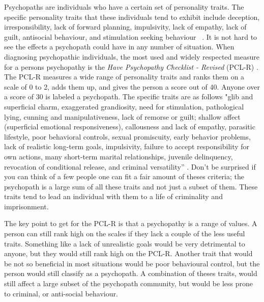 \documentclass[12pt,jou]{apa}
\begin{document}


\pagestyle{fancy}
\fancyhf{}
\fancyhead[R]{\thepage}

Psychopaths are individuals who have a certain set of personality traits.
 The specific personality traits that these individuals tend
to exhibit include deception, irresponsibility, lack of forward planning,
impulsivity, lack of empathy, lack of guilt, antisocial behaviour, and
stimulation seeking behaviour ~\cite{brazil}. It is not hard to see the effects
a psychopath could have in any number of situation. When diagnosing
psychopathic individuals, the most used and widely respected measure for a
persons psychopathy is the \textit{Have Psychopathy Checklist - Revised
}(PCL-R) \cite{nickerson2014}. The PCL-R measures a wide range of personality
traits and ranks them on a scale of 0 to 2, adds them up, and gives the person
a score out of 40. Anyone over a score of 30 is labeled a psychopath. The
specific traits are as follows "glib and superficial charm, exaggerated
grandiosity, need for stimulation, pathological lying, cunning and
manipulativeness, lack of remorse or guilt; shallow affect (superficial
emotional responsiveness), callousness and lack of empathy, parasitic
lifestyle, poor behavioral controls, sexual promiscuity, early behavior
problems, lack of realistic long-term goals, impulsivity, failure to accept
responsibility for own actions, many short-term marital relationships, juvenile
delinquency, revocation of conditional release, and criminal versatility”
\cite{hareharpur1991}. Don't be surprised if you can think of a few people one
can fit a fair amount of theses criteria; the psychopath is a large sum of all
these traits and not just a subset of them. These traits tend to lead an
individual with them to a life of criminality and imprisonment. 

The key point to get for the PCL-R is that a psychopathy is a range of values.
A person can still rank high on the scales if they lack a couple of the less
useful traits. Something like a lack of unrealistic goals would be very
detrimental to anyone, but they would still rank high on the PCL-R. Another
trait that would be not so beneficial in most situations would be poor
behavioural control, but the person would still classify as a psychopath. A
combination of theses traits, would still affect a large subset of the
psychopath community, but would be less prone to criminal, or
anti-social behaviour. 
\end{document}
